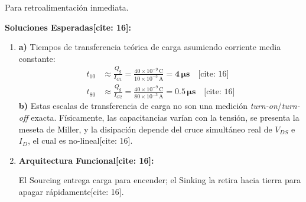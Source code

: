 \documentclass[11pt, a4paper]{article}
\begin{document}
\newpage
\begin{tcolorbox}[colback=red!5, colframe=red!70!black, title=\textbf{Clave Docente: Solucionario del Taller E2[cite: 16]}]
    Para retroalimentación inmediata.
\end{tcolorbox}

\textbf{Soluciones Esperadas[cite: 16]:}
\begin{enumerate}
    \item \textbf{a)} Tiempos de transferencia teórica de carga asumiendo corriente media constante:
    \begin{align*}
        t_{10} &\approx \frac{Q_g}{I_{G1}} = \frac{40 \times 10^{-9}\,\text{C}}{10 \times 10^{-3}\,\text{A}} = \mathbf{4\,\mu\text{s}} \quad \text{[cite: 16]} \\
        t_{80} &\approx \frac{Q_g}{I_{G2}} = \frac{40 \times 10^{-9}\,\text{C}}{80 \times 10^{-3}\,\text{A}} = \mathbf{0.5\,\mu\text{s}} \quad \text{[cite: 16]}
    \end{align*}
    \textbf{b)} Estas escalas de transferencia de carga no son una medición \textit{turn-on}/\textit{turn-off} exacta. Físicamente, las capacitancias varían con la tensión, se presenta la meseta de Miller, y la disipación depende del cruce simultáneo real de $V_{DS}$ e $I_D$, el cual es no-lineal[cite: 16].

    \item \textbf{Arquitectura Funcional[cite: 16]:} 
    \begin{center}
    \end{center}
    El Sourcing entrega carga para encender; el Sinking la retira hacia tierra para apagar rápidamente[cite: 16].


\end{enumerate}
\end{document}
